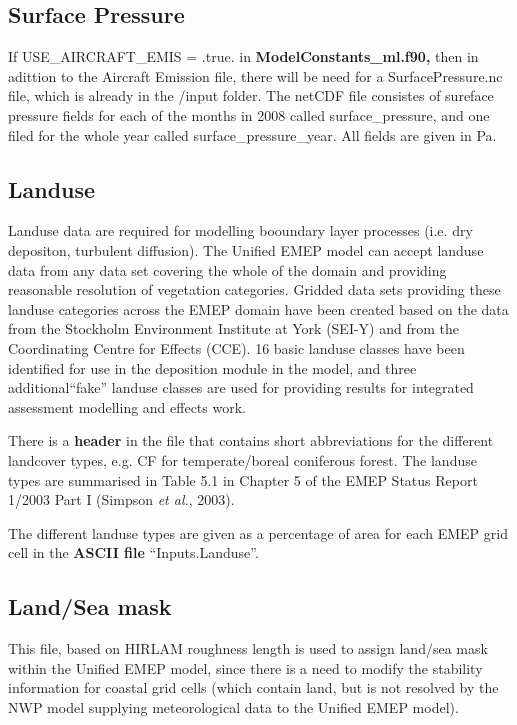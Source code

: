 \subsection{Surface Pressure}

If USE\_AIRCRAFT\_EMIS = .true. in { \bf ModelConstants\_ml.f90,} then in adittion to the Aircraft 
Emission file, there will be need for a SurfacePressure.nc file, which is already in the /input folder. 
The netCDF file consistes of sureface pressure fields for each of the months in 2008 called surface\_pressure, and one filed for the 
whole year called surface\_pressure\_year. All fields are given in Pa. 


\subsection{Landuse}

Landuse data are required for modelling booundary layer processes
(i.e. dry depositon, turbulent diffusion).
The Unified EMEP model can accept landuse data from any
data set covering the whole of the domain and providing reasonable 
resolution of vegetation categories. Gridded data sets providing
these landuse categories across the EMEP domain have been created
based on the data from the Stockholm Environment Institute at York 
(SEI-Y) and from the Coordinating Centre for Effects (CCE). 
16 basic landuse classes have been identified for use in the
deposition module in the model, and three additional``fake'' landuse
classes are used for providing results for integrated assessment
modelling and effects work.

There is a {\bf header} in the file that contains short abbreviations 
for the different landcover
types, e.g. CF for temperate/boreal coniferous forest. The landuse
types are summarised in Table 5.1 in Chapter 5 of the EMEP Status
Report 1/2003 Part I (Simpson {\sl et al.}, 2003).

The different landuse types are given as a percentage of area for each 
EMEP grid cell in the {\bf ASCII file} ``Inputs.Landuse''. 



\subsection{Land/Sea mask}
This file, based on HIRLAM roughness length is used
to assign land/sea mask within the Unified EMEP model, since there is
a need to modify the stability information for coastal grid cells
(which contain land, but is not resolved by the NWP model supplying 
meteorological data to the Unified EMEP model). 

